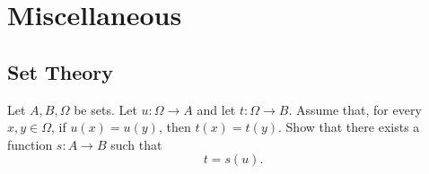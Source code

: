 %
%
%
%
%
%
%
%
%
%
%
%




\section{Miscellaneous}

\subsection{Set Theory}

\begin{proposition} Let $A,B,\Omega$ be sets.  Let $u:\Omega\to A$ and let $t:\Omega\to B$.  Assume that, for every $x,y\in\Omega$, if $u(x)=u(y)$, then $t(x)=t(y)$.  Show that there exists a function $s: A\to B$ such that
$$t=s(u).$$

\end{proposition}

